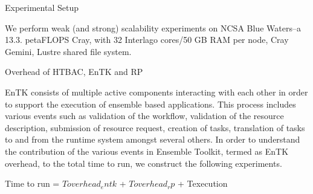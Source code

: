 Experimental Setup

We perform weak (and strong) scalability experiments on NCSA Blue Waters--a 13.3. petaFLOPS Cray, with 32 Interlago cores/50 GB RAM per node, Cray Gemini, Lustre shared file system.	

Overhead of HTBAC, EnTK and RP

EnTK consists of multiple active components interacting with each other in order to support the execution of ensemble based applications. This process includes various events such as validation of the workflow, validation of the resource description, submission of resource request, creation of tasks, translation of tasks to and from the runtime system amongst several others. In order to understand the contribution of the various events in Ensemble Toolkit, termed as EnTK overhead, to the total time to run, we construct the following experiments.

Time to run = $Toverhead_entk$ + $Toverhead_rp$ + Texecution 

